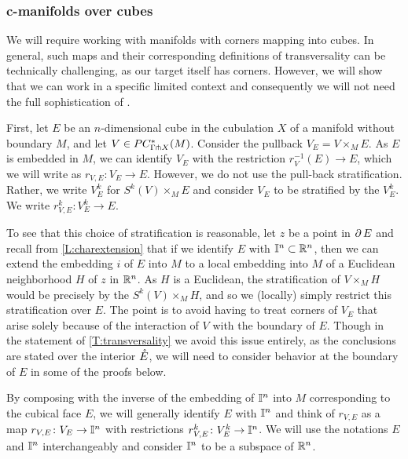 \medskip

\subsubsection{c-manifolds over cubes}\label{reductiontocubes}

We will require working with manifolds with corners mapping into cubes.
In general, such maps and their corresponding definitions of transversality can be technically challenging, as our target itself has corners.
However, we will show that we can work in a specific limited context and consequently we will not need the full sophistication of \cite{Joy12}.

First, let $E$ be an $n$-dimensional cube in the cubulation $X$ of a manifold without boundary $M$, and let $V \in PC_{\Gamma \pitchfork X}^*(M)$.
Consider the pullback $V_E = V \times_M E$.
As $E$ is embedded in $M$, we can identify $V_E$ with the restriction $r_V^{-1}(E) \to E$, which we will write as $r_{V,E} \colon V_E \to E$.
However, we do not use the pull-back stratification.
Rather, we write $V_E^k$ for $S^k(V) \times_M E$ and consider $V_E$ to be stratified by the $V_E^k$.
We write $r_{V,E}^k \colon V_E^k \to E$.

To see that this choice of stratification is reasonable, let $z$ be a point in $\operatorname{\partial} E$ and recall from \cref{L:charextension} that if we identify $E$ with $\mathbb{I}^n \subset \mathbb{R}^n$, then we can extend the embedding $i$ of $E$ into $M$ to a local embedding into $M$ of a Euclidean neighborhood $H$ of $z$ in $\mathbb{R}^n$.
As $H$ is a Euclidean, the stratification of $V \times_M H$ would be precisely by the $S^k(V) \times_M H$, and so we (locally) simply restrict this stratification over $E$.
The point is to avoid having to treat corners of $V_E$ that arise solely because of the interaction of $V$ with the boundary of $E$.
Though in the statement of \cref{T:transversality} we avoid this issue entirely, as the conclusions are stated over the interior $\mathring{E}$, we will need to consider behavior at the boundary of $E$ in some of the proofs below.

By composing with the inverse of the embedding of $\mathbb{I}^n$ into $M$ corresponding to the cubical face $E$, we will generally identify $E$ with $\mathbb{I}^n$ and think of $r_{V,E}$ as a map $r_{V,E} \colon V_E \to \mathbb{I}^n$ with restrictions $r_{V,E}^k \colon V_E^k \to \mathbb{I}^n$.
We will use the notations $E$ and $\mathbb{I}^n$ interchangeably and consider $\mathbb{I}^n$ to be a subspace of $\mathbb{R}^n$.

